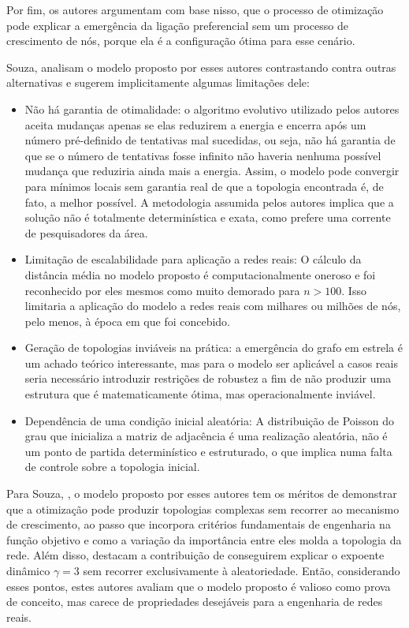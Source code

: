 \documentclass[12pt,oneside,a4paper,brazil,sumario=tradicional]{abntex2}
\begin{document}
Por fim, os autores argumentam com base nisso, que o processo de otimização pode explicar a emergência da ligação preferencial sem um processo de crescimento de nós, porque ela é a configuração ótima para esse cenário.

Souza,  analisam o modelo proposto por esses autores contrastando contra outras alternativas e sugerem implicitamente algumas limitações dele:

\begin{itemize}
  \item Não há garantia de otimalidade: o algoritmo evolutivo utilizado pelos autores aceita mudanças apenas se elas reduzirem a energia e encerra após um número pré-definido de tentativas mal sucedidas, ou seja, não há garantia de que se o número de tentativas fosse infinito não haveria nenhuma possível mudança que reduziria ainda mais a energia. Assim, o modelo pode convergir para mínimos locais sem garantia real de que a topologia encontrada é, de fato, a melhor possível. A metodologia assumida pelos autores implica que a solução não é totalmente determinística e exata, como prefere uma corrente de pesquisadores da área.
  \item Limitação de escalabilidade para aplicação a redes reais: O cálculo da distância média no modelo proposto é computacionalmente oneroso e foi reconhecido por eles mesmos como muito demorado para $n > 100$. Isso limitaria a aplicação do modelo a redes reais com milhares ou milhões de nós, pelo menos, à época em que foi concebido.
  \item Geração de topologias inviáveis na prática: a emergência do grafo em estrela é um achado teórico interessante, mas para o modelo ser aplicável a casos reais seria necessário introduzir restrições de robustez a fim de não produzir uma estrutura que é matematicamente ótima, mas operacionalmente inviável.
  \item Dependência de uma condição inicial aleatória: A distribuição de Poisson do grau que inicializa a matriz de adjacência é uma realização aleatória, não é um ponto de partida determinístico e estruturado, o que implica numa falta de controle sobre a topologia inicial.
\end{itemize}
Para Souza, , o modelo proposto por esses autores tem os méritos de demonstrar que a otimização pode produzir topologias complexas sem recorrer ao mecanismo de crescimento, ao passo que incorpora critérios fundamentais de engenharia na função objetivo e como a variação da importância entre eles molda a topologia da rede. Além disso, destacam a contribuição de conseguirem explicar o expoente dinâmico $\gamma = 3$ sem recorrer exclusivamente à aleatoriedade. Então, considerando esses pontos, estes autores avaliam que o modelo proposto é valioso como prova de conceito, mas carece de propriedades desejáveis para a engenharia de redes reais.
\end{document}
